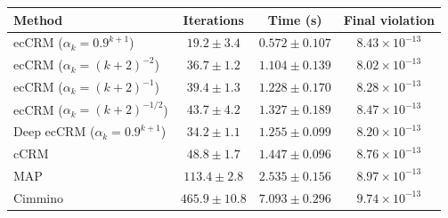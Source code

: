 \begin{tabular}{lccc}
\toprule
Method & Iterations & Time (s) & Final violation \\
\midrule
ecCRM ($\alpha_k=0.9^{k+1}$) & $\mathbf{19.2 \pm 3.4}$ & $\mathbf{0.572 \pm 0.107}$ & $8.43 \times 10^{-13}$ \\
ecCRM ($\alpha_k=(k+2)^{-2}$) & $36.7 \pm 1.2$ & $1.104 \pm 0.139$ & $8.02 \times 10^{-13}$ \\
ecCRM ($\alpha_k=(k+2)^{-1}$) & $39.4 \pm 1.3$ & $1.228 \pm 0.170$ & $8.28 \times 10^{-13}$ \\
ecCRM ($\alpha_k=(k+2)^{-1/2}$) & $43.7 \pm 4.2$ & $1.327 \pm 0.189$ & $8.47 \times 10^{-13}$ \\
Deep ecCRM ($\alpha_k=0.9^{k+1}$) & $34.2 \pm 1.1$ & $1.255 \pm 0.099$ & $8.20 \times 10^{-13}$ \\
cCRM & $48.8 \pm 1.7$ & $1.447 \pm 0.096$ & $8.76 \times 10^{-13}$ \\
MAP & $113.4 \pm 2.8$ & $2.535 \pm 0.156$ & $8.97 \times 10^{-13}$ \\
Cimmino & $465.9 \pm 10.8$ & $7.093 \pm 0.296$ & $9.74 \times 10^{-13}$ \\
\bottomrule
\end{tabular}
